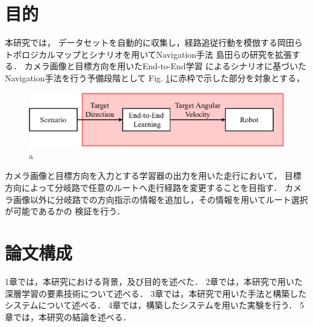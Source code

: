 \section{目的}
本研究では，
データセットを自動的に収集し，経路追従行動を模倣する岡田ら
トポロジカルマップとシナリオを用いてNavigation手法
島田らの研究を拡張する．
カメラ画像と目標方向を用いたEnd-to-End学習
によるシナリオに基づいたNavigation手法を行う予備段階として
Fig. \ref{fig::haikei_abs}に赤枠で示した部分を対象とする，
\begin{figure}[H]
    \centering
    \includegraphics[width = 12cm]{./figs/haikei_abs.pdf}
    \caption{a}
    \label{fig::haikei_abs}
\end{figure}

カメラ画像と目標方向を入力とする学習器の出力を用いた走行において，
目標方向によって分岐路で任意のルートへ走行経路を変更することを目指す．
カメラ画像以外に分岐路での方向指示の情報を追加し，その情報を用いてルート選択が可能であるかの
検証を行う．


\section{論文構成}
1章では，本研究における背景，及び目的を述べた．
2章では，本研究で用いた深層学習の要素技術について述べる．
3章では，本研究で用いた手法と構築したシステムについて述べる．
4章では，構築したシステムを用いた実験を行う．
5章では，本研究の結論を述べる．
